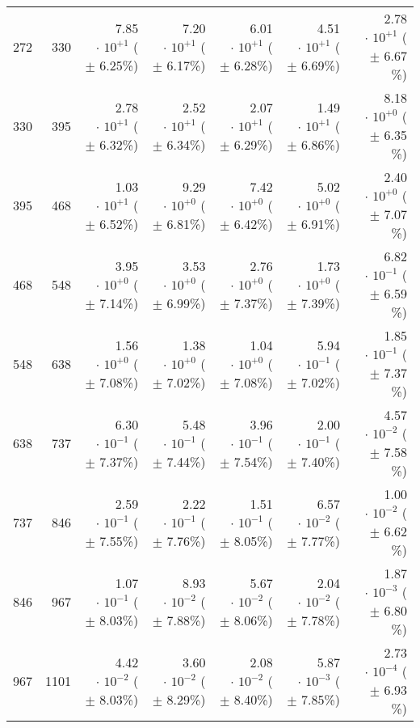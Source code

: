 \begin{table}[h!]
\begin{center}
\begin{tabular}{|r|r|r|r|r|r|r|}
 272 &  330 & 7.85$\,\cdot\, 10^{+1}$  ($\pm\!\!$  6.25\%) & 7.20$\,\cdot\, 10^{+1}$  ($\pm\!\!$  6.17\%) & 6.01$\,\cdot\, 10^{+1}$  ($\pm\!\!$  6.28\%) & 4.51$\,\cdot\, 10^{+1}$  ($\pm\!\!$  6.69\%) & 2.78$\,\cdot\, 10^{+1}$  ($\pm\!\!$  6.67 \%)\\
 330 &  395 & 2.78$\,\cdot\, 10^{+1}$  ($\pm\!\!$  6.32\%) & 2.52$\,\cdot\, 10^{+1}$  ($\pm\!\!$  6.34\%) & 2.07$\,\cdot\, 10^{+1}$  ($\pm\!\!$  6.29\%) & 1.49$\,\cdot\, 10^{+1}$  ($\pm\!\!$  6.86\%) & 8.18$\,\cdot\, 10^{+0}$  ($\pm\!\!$  6.35 \%)\\
 395 &  468 & 1.03$\,\cdot\, 10^{+1}$  ($\pm\!\!$  6.52\%) & 9.29$\,\cdot\, 10^{+0}$  ($\pm\!\!$  6.81\%) & 7.42$\,\cdot\, 10^{+0}$  ($\pm\!\!$  6.42\%) & 5.02$\,\cdot\, 10^{+0}$  ($\pm\!\!$  6.91\%) & 2.40$\,\cdot\, 10^{+0}$  ($\pm\!\!$  7.07 \%)\\
 468 &  548 & 3.95$\,\cdot\, 10^{+0}$  ($\pm\!\!$  7.14\%) & 3.53$\,\cdot\, 10^{+0}$  ($\pm\!\!$  6.99\%) & 2.76$\,\cdot\, 10^{+0}$  ($\pm\!\!$  7.37\%) & 1.73$\,\cdot\, 10^{+0}$  ($\pm\!\!$  7.39\%) & 6.82$\,\cdot\, 10^{-1}$  ($\pm\!\!$  6.59 \%)\\
 548 &  638 & 1.56$\,\cdot\, 10^{+0}$  ($\pm\!\!$  7.08\%) & 1.38$\,\cdot\, 10^{+0}$  ($\pm\!\!$  7.02\%) & 1.04$\,\cdot\, 10^{+0}$  ($\pm\!\!$  7.08\%) & 5.94$\,\cdot\, 10^{-1}$  ($\pm\!\!$  7.02\%) & 1.85$\,\cdot\, 10^{-1}$  ($\pm\!\!$  7.37 \%)\\
 638 &  737 & 6.30$\,\cdot\, 10^{-1}$  ($\pm\!\!$  7.37\%) & 5.48$\,\cdot\, 10^{-1}$  ($\pm\!\!$  7.44\%) & 3.96$\,\cdot\, 10^{-1}$  ($\pm\!\!$  7.54\%) & 2.00$\,\cdot\, 10^{-1}$  ($\pm\!\!$  7.40\%) & 4.57$\,\cdot\, 10^{-2}$  ($\pm\!\!$  7.58 \%)\\
 737 &  846 & 2.59$\,\cdot\, 10^{-1}$  ($\pm\!\!$  7.55\%) & 2.22$\,\cdot\, 10^{-1}$  ($\pm\!\!$  7.76\%) & 1.51$\,\cdot\, 10^{-1}$  ($\pm\!\!$  8.05\%) & 6.57$\,\cdot\, 10^{-2}$  ($\pm\!\!$  7.77\%) & 1.00$\,\cdot\, 10^{-2}$  ($\pm\!\!$  6.62 \%)\\
 846 &  967 & 1.07$\,\cdot\, 10^{-1}$  ($\pm\!\!$  8.03\%) & 8.93$\,\cdot\, 10^{-2}$  ($\pm\!\!$  7.88\%) & 5.67$\,\cdot\, 10^{-2}$  ($\pm\!\!$  8.06\%) & 2.04$\,\cdot\, 10^{-2}$  ($\pm\!\!$  7.78\%) & 1.87$\,\cdot\, 10^{-3}$  ($\pm\!\!$  6.80 \%)\\
 967 & 1101 & 4.42$\,\cdot\, 10^{-2}$  ($\pm\!\!$  8.03\%) & 3.60$\,\cdot\, 10^{-2}$  ($\pm\!\!$  8.29\%) & 2.08$\,\cdot\, 10^{-2}$  ($\pm\!\!$  8.40\%) & 5.87$\,\cdot\, 10^{-3}$  ($\pm\!\!$  7.85\%) & 2.73$\,\cdot\, 10^{-4}$  ($\pm\!\!$  6.93 \%)\\

\end{tabular}
\end{center}
\end{table}
